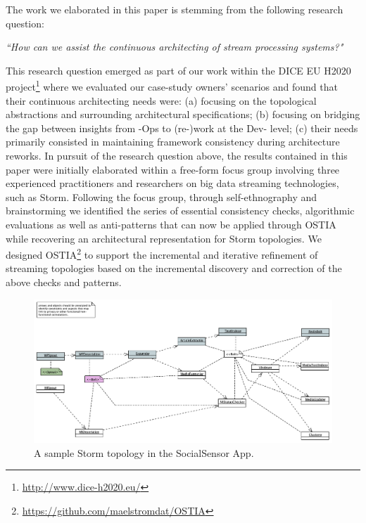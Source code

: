 
The work we elaborated in this paper is stemming from the following research question:

\begin{center}
\emph{``How can we assist the continuous architecting of stream processing systems?"}
\end{center}

This research question emerged as part of our work within the DICE EU H2020 project\footnote{\url{http://www.dice-h2020.eu/}} where we evaluated our case-study owners' scenarios and found that their continuous architecting needs were: (a) focusing on the topological abstractions and surrounding architectural specifications; (b) focusing on bridging the gap between insights from -Ops to (re-)work at the Dev- level; (c) their needs primarily consisted in maintaining framework consistency during architecture reworks.
In pursuit of the research question above, the results contained in this paper were initially elaborated within a free-form focus group \cite{focusgroup} involving three experienced practitioners and researchers on big data streaming technologies, such as Storm. Following the focus group, through self-ethnography \cite{selfeth} and brainstorming we identified the series of essential consistency checks, algorithmic evaluations as well as anti-patterns that can now be applied through OSTIA while recovering an architectural representation for Storm topologies. We designed OSTIA\footnote{\url{https://github.com/maelstromdat/OSTIA}} to support the incremental and iterative refinement of streaming topologies based on the incremental discovery and correction of the above checks and patterns.

\begin{figure}
  \centering
  \includegraphics[width=12cm]{images/socialsensor}
  \caption{A sample Storm topology in the SocialSensor App.}
  \label{socialsensor-topology}
\end{figure}

